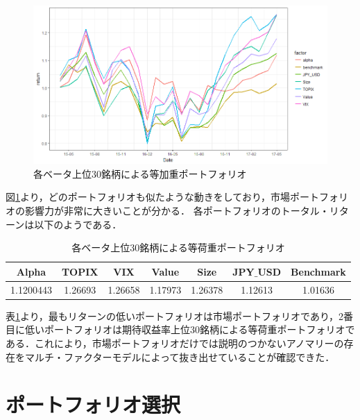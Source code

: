﻿\documentclass[11pt]{jreport}
\begin{document}
\begin{figure}[H]
	\begin{center}
		\includegraphics[width=15cm]{./fig/factor_top30.png}
		\caption{各ベータ上位30銘柄による等加重ポートフォリオ}
		\label{fig:factor_top30}
	\end{center}
\end{figure}


図\ref{fig:factor_top30}より，どのポートフォリオも似たような動きをしており，市場ポートフォリオの影響力が非常に大きいことが分かる．
各ポートフォリオのトータル・リターンは以下のようである．

\begin{table}[H]
\begin{center}
\begin{tabular}{|c|c|c|c|c|c||c|}
\hline
 Alpha  &    TOPIX   &             VIX      &        Value   &         Size       &        JPY$\_$USD &Benchmark   \\      
\hline
1.1200443 & 1.26693 & 1.26658  &  1.17973 & 1.26378 & 1.12613 & 1.01636\\
\hline
\end{tabular}
\end{center}
\caption{各ベータ上位30銘柄による等荷重ポートフォリオ}
\label{tbl:factor_top30}
\end{table}


表\ref{tbl:factor_top30}より，最もリターンの低いポートフォリオは市場ポートフォリオであり，2番目に低いポートフォリオは期待収益率上位30銘柄による等荷重ポートフォリオである．これにより，市場ポートフォリオだけでは説明のつかないアノマリーの存在をマルチ・ファクターモデルによって抜き出せていることが確認できた．

\section{ポートフォリオ選択}
\end{document}

